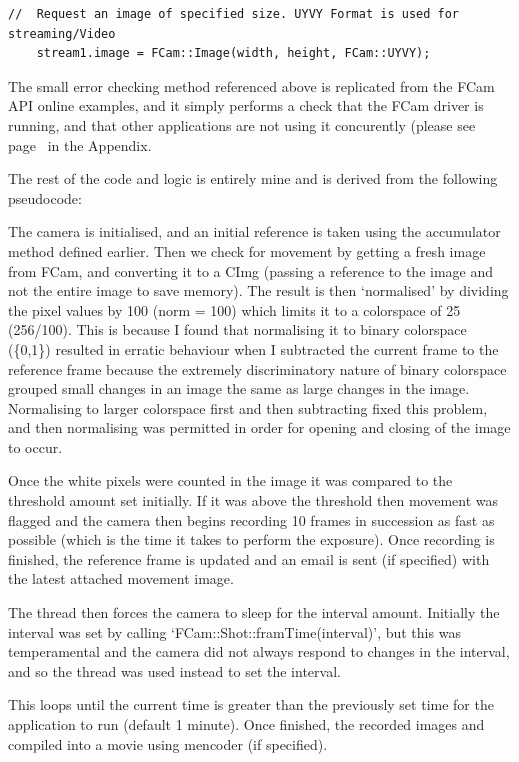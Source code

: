 {{\begin{lstlisting}[title=\bf Snippet initialise() function in Operations.cpp]
    //  Request an image of specified size. UYVY Format is used for streaming/Video
    stream1.image = FCam::Image(width, height, FCam::UYVY);
\end{lstlisting}
The small error checking method referenced above is replicated from the FCam API online examples, and it simply performs a check that the FCam driver is running, and that other applications are not using it concurently (please see page~\pageref{operations} in the Appendix.

The rest of the code and logic is entirely mine and is derived from the following pseudocode:
\begin{frame}{}
	
\end{frame}
The camera is initialised, and an initial reference is taken using the accumulator method defined earlier. Then we check for movement by getting a fresh image from FCam, and converting it to a CImg (passing a reference to the image and not the entire image to save memory). The result is then ‘normalised’ by dividing the pixel values by 100 (norm = 100) which limits it to a colorspace of 25 (256/100). This is because I found that normalising it to binary colorspace (\{0,1\}) resulted in erratic behaviour when I subtracted the current frame to the reference frame because the extremely discriminatory nature of binary colorspace grouped small changes in an image the same as  large changes in the image. Normalising to larger colorspace first and then subtracting fixed this problem, and then normalising was permitted in order for opening and closing of the image to occur.

Once the white pixels were counted in the image it was compared to the threshold amount set initially. If it was above the threshold then movement was flagged and the camera then begins recording 10 frames in succession as fast as possible (which is the time it takes to perform the exposure). Once recording is finished, the reference frame is updated and an email is sent (if specified) with the latest attached movement image. 

The thread then forces the camera to sleep for the interval amount. Initially the interval was set by calling ‘FCam::Shot::framTime(interval)’, but this was temperamental and the camera did not always respond to changes in the interval, and so the thread was used instead to set the interval.

This loops until the current time is greater than the previously set time for the application to run (default 1 minute). Once finished, the recorded images and compiled into a movie using mencoder (if specified).

}}
